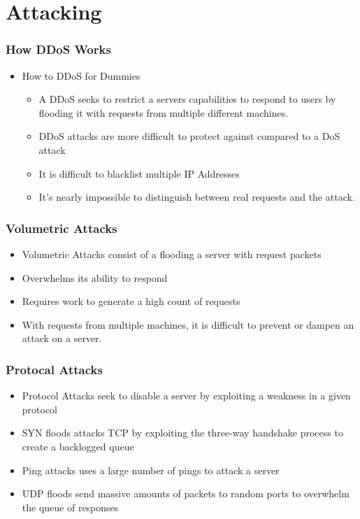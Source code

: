 \documentclass{beamer}
\begin{document}
\section{Attacking}

\begin{frame}
    \frametitle{How DDoS Works}
    \begin{itemize}
        \item How to DDoS for Dummies
            \begin{itemize}
                \item A DDoS seeks to restrict a servers capabilities to respond to users by flooding it with requests from multiple different machines.
                \item DDoS attacks are more difficult to protect against compared to a DoS attack
                \item It is difficult to blacklist multiple IP Addresses
                \item It's nearly impossible to distinguish between real requests and the attack.
            \end{itemize}
    \end{itemize}
\end{frame}

\begin{frame}
    \frametitle{Volumetric Attacks}
        \begin{itemize}
            \item Volumetric Attacks consist of a flooding a server with request packets
            \item Overwhelms its ability to respond
            \item Requires work to generate a high count of requests
            \item With requests from multiple machines, it is difficult to prevent or dampen an attack on a server.
    \end{itemize}
\end{frame}
\begin{frame}
    \frametitle{Protocal Attacks}
     \begin{itemize}
            \item Protocol Attacks seek to disable a server by exploiting a weakness in a given protocol
            \item SYN floods attacks TCP by exploiting the three-way handshake process to create a backlogged queue
            \item Ping attacks uses a large number of pings to attack a server
            \item UDP floods send massive amounts of packets to random ports to overwhelm the queue of responses
        \end{itemize}
\end{frame}
\end{document}

